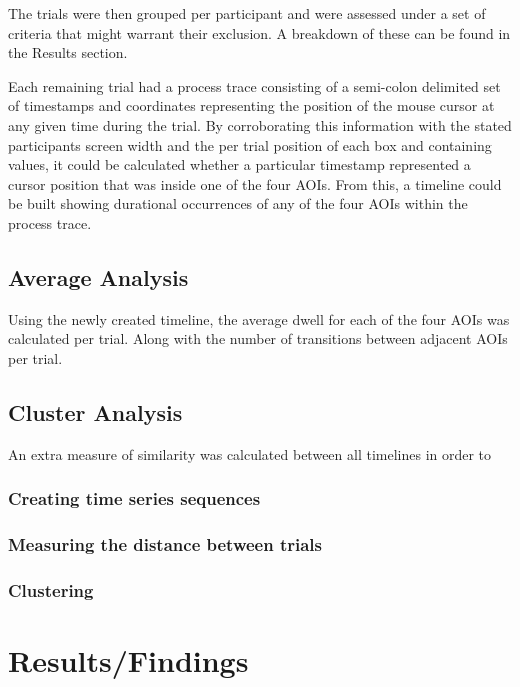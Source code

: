 \documentclass[man, floatsintext]{apa7}
\begin{document}
The trials were then grouped per participant and were assessed under a set of criteria that might warrant their exclusion. A breakdown of these can be found in the Results section.

Each remaining trial had a process trace consisting of a semi-colon delimited set of timestamps and coordinates representing the position of the mouse cursor at any given time during the trial.  By corroborating this information with the stated participants screen width and the per trial position of each box and containing values, it could be calculated whether a particular timestamp represented a cursor position that was inside one of the four AOIs. From this, a timeline could be built showing durational occurrences of any of the four AOIs within the process trace.

\subsection{Average Analysis}

Using the newly created timeline, the average dwell for each of the four AOIs was calculated per trial. Along with the number of transitions between adjacent AOIs per trial. 

\subsection{Cluster Analysis}

An extra measure of similarity was calculated between all timelines in order to 


\subsubsection{Creating time series sequences}

\subsubsection{Measuring the distance between trials}

\subsubsection{Clustering}


\section{Results/Findings}
\end{document}

